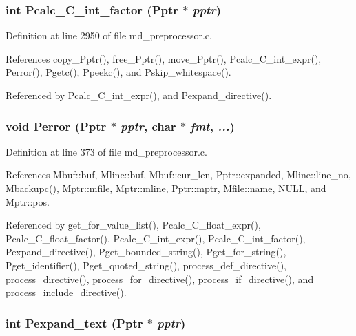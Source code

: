 \subsubsection{\setlength{\rightskip}{0pt plus 5cm}int Pcalc\_\-C\_\-int\_\-factor (\bf{Pptr} $\ast$ {\em pptr})}\label{md__preprocessor_8h_be976f6287689c26f1804b05a5604e1c}




Definition at line 2950 of file md\_\-preprocessor.c.

References copy\_\-Pptr(), free\_\-Pptr(), move\_\-Pptr(), Pcalc\_\-C\_\-int\_\-expr(), Perror(), Pgetc(), Ppeekc(), and Pskip\_\-whitespace().

Referenced by Pcalc\_\-C\_\-int\_\-expr(), and Pexpand\_\-directive().
\subsubsection{\setlength{\rightskip}{0pt plus 5cm}void Perror (\bf{Pptr} $\ast$ {\em pptr}, char $\ast$ {\em fmt},  {\em ...})}\label{md__preprocessor_8h_beffca6eda4a1c83ca9e7f1dd401fd99}




Definition at line 373 of file md\_\-preprocessor.c.

References Mbuf::buf, Mline::buf, Mbuf::cur\_\-len, Pptr::expanded, Mline::line\_\-no, Mbackupc(), Mptr::mfile, Mptr::mline, Pptr::mptr, Mfile::name, NULL, and Mptr::pos.

Referenced by get\_\-for\_\-value\_\-list(), Pcalc\_\-C\_\-float\_\-expr(), Pcalc\_\-C\_\-float\_\-factor(), Pcalc\_\-C\_\-int\_\-expr(), Pcalc\_\-C\_\-int\_\-factor(), Pexpand\_\-directive(), Pget\_\-bounded\_\-string(), Pget\_\-for\_\-string(), Pget\_\-identifier(), Pget\_\-quoted\_\-string(), process\_\-def\_\-directive(), process\_\-directive(), process\_\-for\_\-directive(), process\_\-if\_\-directive(), and process\_\-include\_\-directive().
\subsubsection{\setlength{\rightskip}{0pt plus 5cm}int Pexpand\_\-text (\bf{Pptr} $\ast$ {\em pptr})}\label{md__preprocessor_8h_96dc9d0c7b4e9f7872132290d1cf3ac7}




